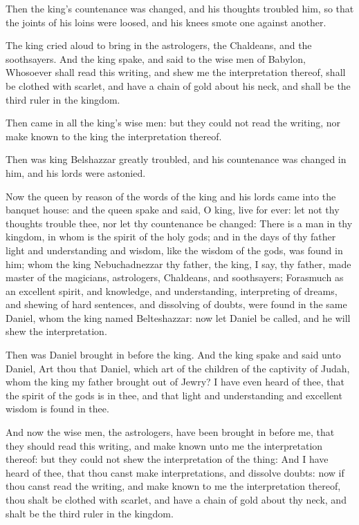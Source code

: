 \Verse Then the king's countenance was changed, and his thoughts troubled him, so that the joints of his loins were loosed, and his knees smote one against another.

\Verse The king cried aloud to bring in the astrologers, the Chaldeans, and the soothsayers. And the king spake, and said to the wise men of Babylon, Whosoever shall read this writing, and shew me the interpretation thereof, shall be clothed with scarlet, and have a chain of gold about his neck, and shall be the third ruler in the kingdom.

\Verse Then came in all the king's wise men: but they could not read the writing, nor make known to the king the interpretation thereof.

\Verse Then was king Belshazzar greatly troubled, and his countenance was changed in him, and his lords were astonied.

\Verse Now the queen by reason of the words of the king and his lords came into the banquet house: and the queen spake and said, O king, live for ever: let not thy thoughts trouble thee, nor let thy countenance be changed: \Verse There is a man in thy kingdom, in whom is the spirit of the holy gods; and in the days of thy father light and understanding and wisdom, like the wisdom of the gods, was found in him; whom the king Nebuchadnezzar thy father, the king, I say, thy father, made master of the magicians, astrologers, Chaldeans, and soothsayers; \Verse Forasmuch as an excellent spirit, and knowledge, and understanding, interpreting of dreams, and shewing of hard sentences, and dissolving of doubts, were found in the same Daniel, whom the king named Belteshazzar: now let Daniel be called, and he will shew the interpretation.

\Verse Then was Daniel brought in before the king. And the king spake and said unto Daniel, Art thou that Daniel, which art of the children of the captivity of Judah, whom the king my father brought out of Jewry?  \Verse I have even heard of thee, that the spirit of the gods is in thee, and that light and understanding and excellent wisdom is found in thee.

\Verse And now the wise men, the astrologers, have been brought in before me, that they should read this writing, and make known unto me the interpretation thereof: but they could not shew the interpretation of the thing: \Verse And I have heard of thee, that thou canst make interpretations, and dissolve doubts: now if thou canst read the writing, and make known to me the interpretation thereof, thou shalt be clothed with scarlet, and have a chain of gold about thy neck, and shalt be the third ruler in the kingdom.

